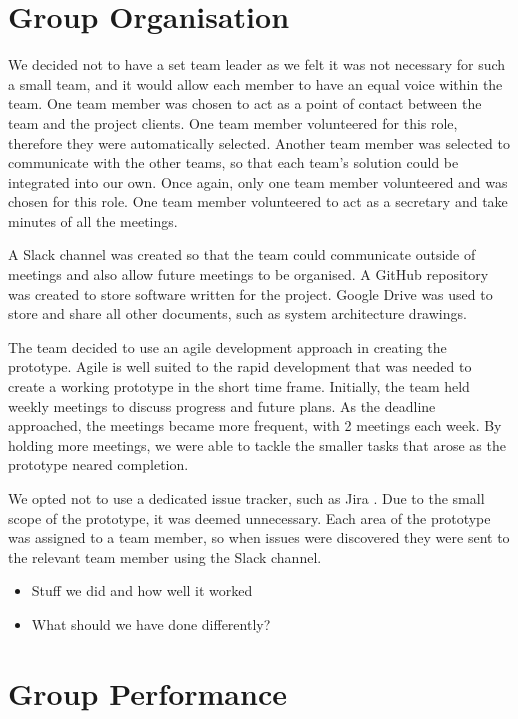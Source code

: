 

\section{Group Organisation}
We decided not to have a set team leader as we felt it was not necessary for such a small team, and it would allow each member to have an equal voice within the team.  One team member was chosen to act as a point of contact between the team and the project clients. One team member volunteered for this role, therefore they were automatically selected. Another team member was selected to communicate with the other teams, so that each team's solution could be integrated into our own. Once again, only one team member volunteered and was chosen for this role. One team member volunteered to act as a secretary and take minutes of all the meetings.

A Slack \cite{slack} channel was created so that the team could communicate outside of meetings and also allow future meetings to be organised. A GitHub \cite{github} repository was created to store software written for the project. Google Drive \cite{googledrive} was used to store and share all other documents, such as system architecture drawings.

The team decided to use an agile development approach in creating the prototype. Agile is well suited to the rapid development that was needed to create a working prototype in the short time frame. Initially, the team held weekly meetings to discuss progress and future plans. As the deadline approached, the meetings became more frequent, with 2 meetings each week. By holding more meetings, we were able to tackle the smaller tasks that arose as the prototype neared completion.

We opted not to use a dedicated issue tracker, such as Jira \cite{jira}. Due to the small scope of the prototype, it was deemed unnecessary. Each area of the prototype was assigned to a team member, so when issues were discovered they were sent to the relevant team member using the Slack channel.

\begin{itemize}
    \item Stuff we did and how well it worked
    \item What should we have done differently?
\end{itemize}

\section{Group Performance}

